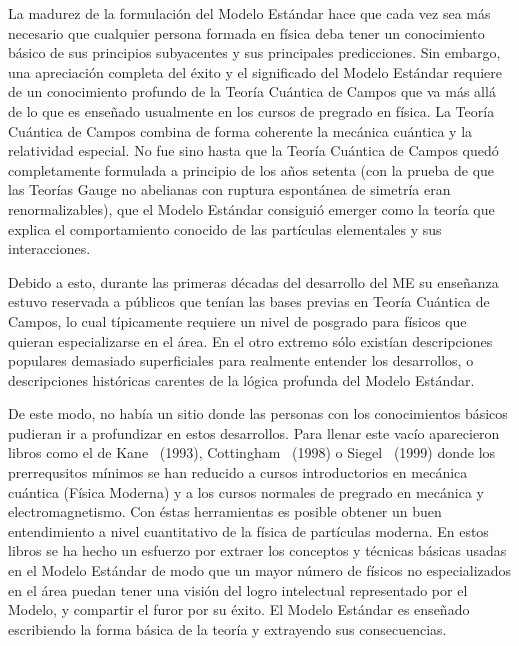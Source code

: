 La madurez de la formulación del Modelo Estándar hace que cada vez sea
más necesario que cualquier persona formada en física deba tener un
conocimiento básico de sus principios subyacentes y sus principales
predicciones. Sin embargo, una apreciación completa del éxito y el
significado del Modelo Estándar requiere de un conocimiento profundo
de la Teoría Cuántica de Campos que va más allá de lo que es
enseñado usualmente en los cursos de pregrado en física.
La Teoría
Cuántica de Campos combina de forma coherente la mecánica cuántica y
la relatividad especial.
%
No fue sino hasta que la Teoría Cuántica de
Campos quedó completamente formulada a principio de los años setenta
(con la prueba de que las Teorías Gauge no abelianas con ruptura
espontánea de simetría eran renormalizables), que el Modelo Estándar
consiguió emerger como la teoría que explica el comportamiento
conocido de las partículas elementales y sus interacciones.

Debido a esto, durante las primeras décadas del desarrollo del ME su
enseñanza estuvo reservada a públicos que tenían las bases previas en
Teoría Cuántica de Campos, lo cual típicamente requiere un nivel de
posgrado para físicos que quieran especializarse en el área. En el
otro extremo sólo existían descripciones populares demasiado
superficiales para realmente entender los desarrollos, o descripciones
históricas carentes de la lógica profunda del Modelo Estándar.

De este modo, no había un sitio donde las personas con los
conocimientos básicos pudieran ir a profundizar en estos
desarrollos. Para llenar este vacío aparecieron libros como el de
Kane~\cite{kane} (1993), Cottingham~\cite{cottingham} (1998) o
Siegel~\cite{Siegel} (1999) donde los prerrequsitos mínimos se han reducido
a cursos introductorios en mecánica cuántica (Física Moderna) y a los cursos
normales de pregrado en mecánica y electromagnetismo. Con éstas
herramientas es posible obtener un buen entendimiento a nivel
cuantitativo de la física de partículas moderna. En estos libros se ha
hecho un esfuerzo por extraer los conceptos y técnicas básicas usadas
en el Modelo Estándar de modo que un mayor número de físicos no
especializados en el área puedan tener una visión del logro
intelectual representado por el Modelo, y compartir el furor
por su éxito. El Modelo Estándar es enseñado
escribiendo la forma básica de la teoría y extrayendo sus
consecuencias.

